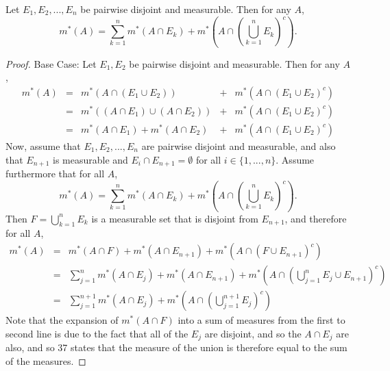 \begin{pblm}%
	Let $E_1, E_2, ... , E_n$ be pairwise disjoint and measurable. Then 
	for any $A$, 
	\begin{equation*}
		m^\ast(A) = \sum\limits_{k=1}^nm^\ast(A\cap E_k)+m^\ast
		\left(A\cap\left(\bigcup\limits_{k=1}^nE_k\right)^c\right).
	\end{equation*}
\begin{proof}
	Base Case: Let $E_1, E_2$ be pairwise disjoint and measurable. Then for any $A$, 
	\begin{equation*}
	\begin{array}{rcccc}
		m^\ast(A) & = & m^\ast(A \cap (E_1 \cup E_2)) &+& m^\ast(A\cap(E_1\cup E_2)^c)\\
			& = & m^\ast\left((A \cap E_1)\cup (A \cap E_2)\right) & + & m^\ast(A \cap (E_1 \cup E_2)^c)\\
			& = & m^\ast(A \cap E_1) + m^\ast(A \cap E_2) & + & m^\ast(A\cap (E_1\cup E_2)^c)
	\end{array}
	\end{equation*}
	Now, assume that $E_1, E_2, ... , E_n$ are pairwise disjoint and measurable, and also 
	that $E_{n+1}$ is measurable and $E_i \cap E_{n+1} = \emptyset$ for all $i \in \{1, ... , n\}$. 
	Assume furthermore that for all $A$, 
	\begin{equation*}
		m^\ast(A) = \sum\limits_{k=1}^nm^\ast(A\cap E_k)+m^\ast
		\left(A\cap\left(\bigcup\limits_{k=1}^nE_k\right)^c\right).
	\end{equation*}
	Then $F = \bigcup\limits_{k=1}^nE_k$ is a measurable set that is disjoint from $E_{n+1}$, and therefore 
	for all $A$, 
	\begin{equation*}
	\begin{array}{rcl}
		m^\ast(A) &=& m^\ast(A \cap F) + m^\ast(A\cap E_{n+1}) + m^\ast(A \cap (F \cup E_{n+1})^c)\\
			&=&\sum\limits_{j=1}^nm^\ast(A\cap E_j) + m^\ast(A\cap E_{n+1}) + 
				m^\ast\left(A \cap \left(\bigcup\limits_{j=1}^nE_j \cup E_{n+1}\right)^c\right)\\
			&=&\sum\limits_{j=1}^{n+1}m^\ast(A\cap E_j) + m^\ast\left(A\cap\left(\bigcup\limits_{j=1}^{n+1}E_j\right)^c\right)
	\end{array}
	\end{equation*}
	Note that the expansion of $m^\ast(A\cap F)$ into a sum of measures from the first to second line 
	is due to the fact that all of the $E_j$ are disjoint, and so the $A \cap E_j$ are also, and so 
	37 states that the measure of the union is therefore equal to the sum of the measures. 
\end{proof}
\end{pblm}

